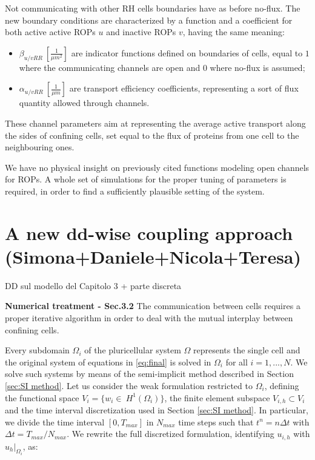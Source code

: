 \documentclass[a4paper]{siamonline220329}
\begin{document}
Not communicating with other RH cells boundaries have as before no-flux. The new boundary conditions are characterized by a function and a coefficient for both active active ROPs $u$ and inactive ROPs $v$, having the same meaning:
\begin{itemize}
  \item $\beta_{u/v RR} \ [\frac{1}{\mu m^2}]$ are indicator functions defined on boundaries of cells, equal to $1$ where the communicating channels are open and $0$ where  no-flux is assumed;
  \item $\alpha_{u/v RR} \ [\frac{1}{\mu m}]$ are transport efficiency coefficients, representing a sort of flux quantity allowed through channels.
  \end{itemize}
These channel parameters aim at representing the average active transport along the sides of confining cells, set equal to the flux of proteins from one cell to the neighbouring ones.

We have no physical insight on previously cited functions modeling open channels for ROPs. A whole set of simulations for the proper tuning of parameters is required, in order to find a sufficiently plausible setting of the system.

\section{A new dd-wise coupling approach (Simona+Daniele+Nicola+Teresa)}

DD sul modello del Capitolo 3 + parte discreta

\textbf{Numerical treatment - Sec.3.2}
The communication between cells requires a proper iterative algorithm in order to deal with the mutual interplay between confining cells.

Every subdomain $\Omega_i$ of the pluricellular system $\Omega$ represents the single cell and the original system of equations in \eqref{eq:final} is solved in $\Omega_i$ for all $i = 1, ..., N$. We solve such systems by means of the semi-implicit method described in Section \ref{sec:SI method}. Let us consider the weak formulation restricted to $\Omega_i$, defining the functional space $V_i = \{ w_i \in \ H^1\left(\Omega_i\right)\}$, the finite element subspace $V_{i,h} \subset V_i $ and the time interval discretization used in Section \ref{sec:SI method}. In particular, we divide the time interval $\left[0, T_{max}\right]$ in $N_{max}$ time steps such that $t^n = n \Delta t$ with $\Delta t = T_{max} / N_{max}  $. We rewrite the full discretized formulation, identifying $u_{i,h}$ with $u_h|_{\Omega_i}$, as:
\end{document}
